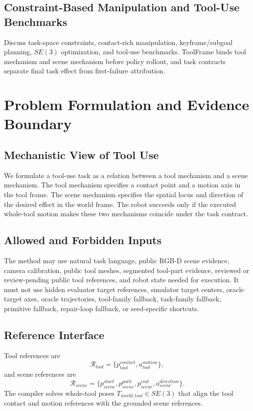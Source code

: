 \documentclass[letterpaper, 10 pt, journal, twoside]{IEEEtran}
\newcommand{\method}{ToolFrame}
\begin{document}
\subsection{Constraint-Based Manipulation and Tool-Use Benchmarks}
Discuss task-space constraints, contact-rich manipulation, keyframe/subgoal
planning, $SE(3)$ optimization, and tool-use benchmarks. \method{} binds tool
mechanism and scene mechanism before policy rollout, and task contracts
separate final task effect from first-failure attribution.

\section{Problem Formulation and Evidence Boundary}
\subsection{Mechanistic View of Tool Use}
We formulate a tool-use task as a relation between a tool mechanism and a scene
mechanism. The tool mechanism specifies a contact point and a motion axis in
the tool frame. The scene mechanism specifies the spatial locus and direction
of the desired effect in the world frame. The robot succeeds only if the
executed whole-tool motion makes these two mechanisms coincide under the task
contract.

\subsection{Allowed and Forbidden Inputs}
The method may use natural task language, public RGB-D scene evidence, camera
calibration, public tool meshes, segmented tool-part evidence, reviewed or
review-pending public tool references, and robot state needed for execution. It
must not use hidden evaluator target references, simulator target centers,
oracle target axes, oracle trajectories, tool-family fallback, task-family
fallback, primitive fallback, repair-loop fallback, or seed-specific shortcuts.

\subsection{Reference Interface}
Tool references are
\begin{equation}
  \mathcal{R}_{tool} =
  \{p^{contact}_{tool}, a^{motion}_{tool}\},
\end{equation}
and scene references are
\begin{equation}
  \mathcal{R}_{scene} =
  \{p^{start}_{scene}, p^{path}_{scene}, p^{end}_{scene},
  a^{direction}_{scene}\}.
\end{equation}
The compiler solves whole-tool poses $T_{world,tool}\in SE(3)$ that align the
tool contact and motion references with the grounded scene references.
\end{document}
